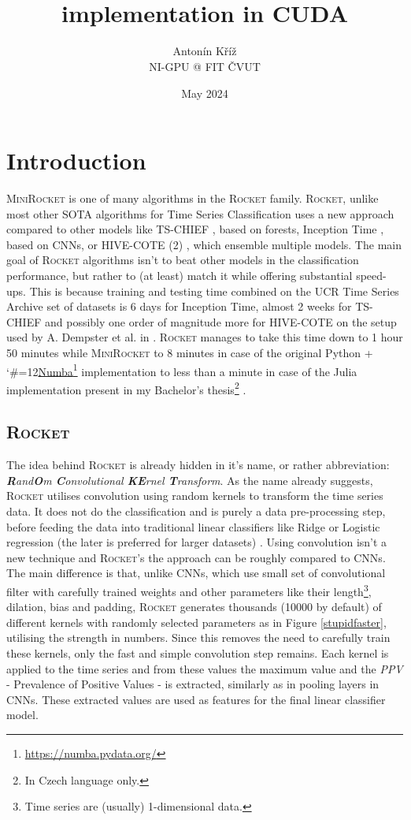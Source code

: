 \documentclass{article}
\title{%
    \CUKETA~\texttwemoji{zucchini}\\
    \large\MINIROCKET implementation in CUDA
}
\author{Antonín Kříž \\ NI-GPU @ FIT ČVUT}
\date{May 2024}
\newcommand\footlink{\begingroup\catcode`\#=12\relax\linkk}
\newcommand\linkk[2]{\endgroup\href{#1}{#2}\footnote{\raggedright\scriptsize\sloppy\url{#1}}}
\newcommand\ROCKET{\textsc{Rocket}\xspace}
\newcommand\MINIROCKET{\textsc{MiniRocket}\xspace}
\begin{document}
\maketitle

\section{Introduction}

\MINIROCKET \cite{minirocket} is one of many algorithms in the \ROCKET \cite{rocket} family. \ROCKET, unlike most other SOTA algorithms for Time Series Classification uses a new approach compared to other models like TS-CHIEF \cite{tschief}, based on forests, Inception Time \cite{inceptiontime}, based on CNNs, or HIVE-COTE (2) \cite{hivecote, hivecote2}, which ensemble multiple models. The main goal of \ROCKET algorithms isn't to beat other models in the classification performance, but rather to (at least) match it while offering substantial speed-ups. This is because training and testing time combined on the UCR Time Series Archive \cite{ucrdataset} set of datasets is 6 days for Inception Time, almost 2 weeks for TS-CHIEF and possibly one order of magnitude more for HIVE-COTE on the setup used by A. Dempster et al. in \cite{rocket}. \ROCKET manages to take this time down to 1 hour 50 minutes while \MINIROCKET to 8 minutes \cite{minirocket} in case of the original Python + \footlink{https://numba.pydata.org/}{Numba} implementation to less than a minute in case of the Julia implementation present in my Bachelor's thesis\footnote{In Czech language only.} \cite{tscjulia}.

\subsection{\ROCKET}

The idea behind \ROCKET is already hidden in it's name, or rather abbreviation: \emph{\textbf{R}and\textbf{O}m \textbf{C}onvolutional \textbf{KE}rnel \textbf{T}ransform}. As the name already suggests, \ROCKET utilises convolution using random kernels to transform the time series data. It does not do the classification and is purely a data pre-processing step, before feeding the data into traditional linear classifiers like Ridge or Logistic regression (the later is preferred for larger datasets) \cite{rocket}. Using convolution isn't a new technique and \ROCKET's the approach  can be roughly compared to CNNs. The main difference is that, unlike CNNs, which use small set of convolutional filter with carefully trained weights and other parameters like their length\footnote{Time series are (usually) 1-dimensional data.}, dilation, bias and padding, \ROCKET generates thousands (10000 by default) of different kernels with randomly selected parameters as in Figure \ref{stupidfaster}, utilising the strength in numbers. Since this removes the need to carefully train these kernels, only the fast and simple convolution step remains. Each kernel is applied to the time series and from these values the maximum value and the \emph{PPV} - Prevalence of Positive Values - is extracted, similarly as in pooling layers in CNNs. These extracted values are used as features for the final linear classifier model.
\end{document}
